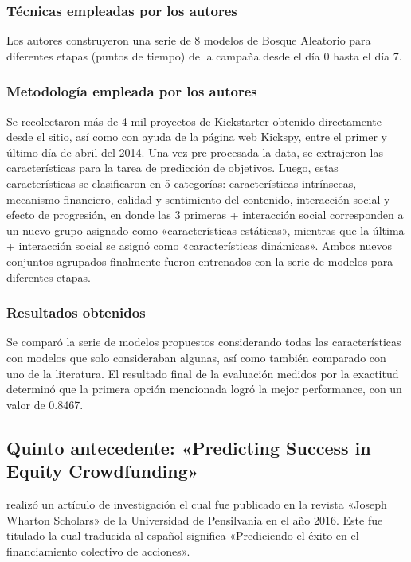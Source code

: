 \subsubsection{Técnicas empleadas por los autores}
Los autores construyeron una serie de 8 modelos de Bosque Aleatorio para diferentes etapas (puntos de tiempo) de la campaña desde el día 0 hasta el día 7.

\subsubsection{Metodología empleada por los autores}
Se recolectaron más de 4 mil proyectos de Kickstarter obtenido directamente desde el sitio, así como con ayuda de la página web Kickspy, entre el primer y último día de abril del 2014. Una vez pre-procesada la data, se extrajeron las características para la tarea de predicción de objetivos. Luego, estas características se clasificaron en 5 categorías: características intrínsecas, mecanismo financiero, calidad y sentimiento del contenido, interacción social y efecto de progresión, en donde las 3 primeras + interacción social corresponden a un nuevo grupo asignado como «características estáticas», mientras que la última + interacción social se asignó como «características dinámicas». Ambos nuevos conjuntos agrupados finalmente fueron entrenados con la serie de modelos para diferentes etapas.

\subsubsection{Resultados obtenidos}
Se comparó la serie de modelos propuestos considerando todas las características con modelos que solo consideraban algunas, así como también comparado con uno de la literatura. El resultado final de la evaluación medidos por la exactitud determinó que la primera opción mencionada logró la mejor performance, con un valor de 0.8467.

\subsection{Quinto antecedente: «Predicting Success in Equity Crowdfunding» \citep*{pr_beckwith2016predcrowd}}
\citeauthor{pr_beckwith2016predcrowd} realizó un artículo de investigación el cual fue publicado en la revista «Joseph Wharton Scholars» de la Universidad de Pensilvania en el año 2016. Este fue titulado  la cual traducida al español significa «Prediciendo el éxito en el financiamiento colectivo de acciones».

